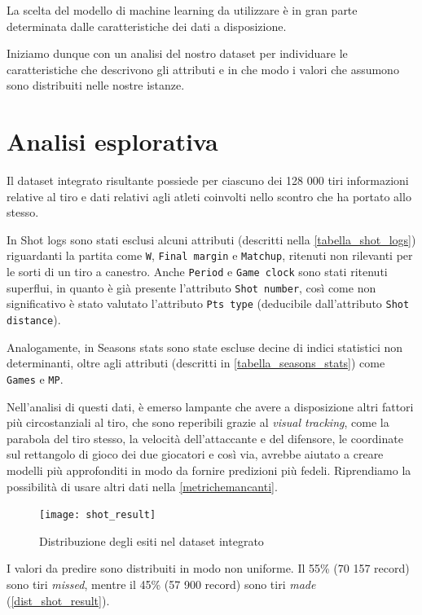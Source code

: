 La scelta del modello di machine learning da utilizzare è in gran parte determinata dalle caratteristiche dei dati a disposizione.

Iniziamo dunque con un analisi del nostro dataset per individuare le caratteristiche che descrivono gli attributi e in che modo i valori che assumono sono distribuiti nelle nostre istanze.

\section{Analisi esplorativa}
\label{analisi_esplorativa}

Il dataset integrato risultante possiede per ciascuno dei 128 000 tiri informazioni relative al tiro e dati relativi agli atleti coinvolti nello scontro che ha portato allo stesso.
\par

In Shot logs sono stati esclusi alcuni attributi (descritti nella \autoref{tabella_shot_logs}) riguardanti la partita come \texttt{W}, \texttt{Final margin} e \texttt{Matchup}, ritenuti non rilevanti per le sorti di un tiro a canestro.
Anche \texttt{Period} e \texttt{Game clock} sono stati ritenuti superflui, in quanto è già presente l'attributo \texttt{Shot number}, così come non significativo è stato valutato l'attributo \texttt{Pts type} (deducibile dall'attributo \texttt{Shot distance}). 
\par
Analogamente, in Seasons stats sono state escluse decine di indici statistici non determinanti, oltre agli attributi (descritti in \autoref{tabella_seasons_stats}) come \texttt{Games} e \texttt{MP}.

\par
Nell'analisi di questi dati, è emerso lampante che avere a disposizione altri fattori più circostanziali al tiro, che sono reperibili grazie al \textit{visual tracking}, come la parabola del tiro stesso, la velocità dell'attaccante e del difensore, le coordinate sul rettangolo di gioco dei due giocatori e così via, avrebbe aiutato a creare modelli più approfonditi in modo da fornire predizioni più fedeli.
Riprendiamo la possibilità di usare altri dati nella \autoref{metrichemancanti}.

\begin{figure}[H]
\caption{Distribuzione degli esiti nel dataset integrato}
\label{dist_shot_result}
	\texttt{[image: shot\_result]}
\end{figure}

I valori da predire sono distribuiti in modo non uniforme. Il 55\% (70 157 record) sono tiri \textit{missed}, mentre il 45\% (57 900 record) sono tiri \textit{made} (\autoref{dist_shot_result}).

